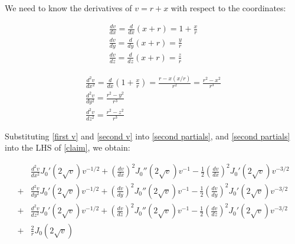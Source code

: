 \documentclass{article}
\begin{document}
\vskip 12pt

We need to know the derivatives of $v=r+x$ with respect to the coordinates:

\vskip 12pt

\begin{equation}
\label{first v}
\begin{gathered}
\frac{d v}{d x} = \frac{d}{d x} (x+r) = 1 + \frac{x}{r} \\
\frac{d v}{d y} = \frac{d}{d y} (x+r) = \frac{y}{r} \\
\frac{d v}{d z} = \frac{d}{d z} (x+r) = \frac{z}{r}
\end{gathered}
\end{equation}

\vskip 12pt

\begin{equation}
\label{second v}
\begin{gathered}
\frac{d^2 v}{d x^2} = \frac{d}{d x} \left(1 + \frac{x}{r}\right) = \frac{r - x(x/r)}{r^2} = \frac{r^2 - x^2}{r^3} \\
\frac{d^2 v}{d y^2} = \frac{r^2 - y^2}{r^3} \\
\frac{d^2 v}{d z^2} = \frac{r^2 - z^2}{r^3}
\end{gathered}
\end{equation}

\vskip 20pt

Substituting \eqref{first v} and \eqref{second v} into \eqref{second partials}, and \eqref{second partials}
into the LHS of \eqref{claim}, we obtain:

\begin{equation*}
\begin{aligned}
&\frac{d^2 v}{d x^2} J_0'(2\sqrt{v}) v^{-1/2} + \left(\frac{d v}{d x}\right)^2 J_0''(2\sqrt{v}) v^{-1} - \frac{1}{2} \left(\frac{d v}{d x}\right)^2 J_0'(2\sqrt{v}) v^{-3/2} \\
+& \frac{d^2 v}{d y^2} J_0'(2\sqrt{v}) v^{-1/2} + \left(\frac{d v}{d y}\right)^2 J_0''(2\sqrt{v}) v^{-1} - \frac{1}{2} \left(\frac{d v}{d y}\right)^2 J_0'(2\sqrt{v}) v^{-3/2} \\
+& \frac{d^2 v}{d z^2} J_0'(2\sqrt{v}) v^{-1/2} + \left(\frac{d v}{d z}\right)^2 J_0''(2\sqrt{v}) v^{-1} - \frac{1}{2} \left(\frac{d v}{d z}\right)^2 J_0'(2\sqrt{v}) v^{-3/2} \\
+& \frac{2}{r} J_0(2\sqrt{v})
\end{aligned}
\end{equation*}
\end{document}
